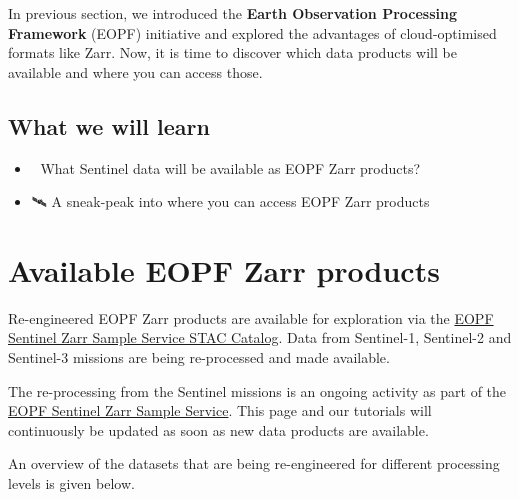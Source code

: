 \documentclass[
  letterpaper,
  DIV=11,
  numbers=noendperiod]{scrreprt}
\providecommand{\tightlist}{%
  \setlength{\itemsep}{0pt}\setlength{\parskip}{0pt}}
\begin{document}
In previous section, we introduced the \textbf{Earth Observation
Processing Framework} (EOPF) initiative and explored the advantages of
cloud-optimised formats like Zarr. Now, it is time to discover which
data products will be available and where you can access those.

\subsection{What we will learn}\label{what-we-will-learn-1}

\begin{itemize}
\tightlist
\item
  💾 What Sentinel data will be available as EOPF Zarr products?
\item
  🛰️ A sneak-peak into where you can access EOPF Zarr products
\end{itemize}

\section{Available EOPF Zarr
products}\label{available-eopf-zarr-products}

Re-engineered EOPF Zarr products are available for exploration via the
\href{https://stac.browser.user.eopf.eodc.eu/?.language=en}{EOPF
Sentinel Zarr Sample Service STAC Catalog}. Data from Sentinel-1,
Sentinel-2 and Sentinel-3 missions are being re-processed and made
available.

\begin{tcolorbox}[enhanced jigsaw, coltitle=black, colback=white, leftrule=.75mm, colbacktitle=quarto-callout-important-color!10!white, titlerule=0mm, title=\textcolor{quarto-callout-important-color}{\faExclamation}\hspace{0.5em}{Important}, rightrule=.15mm, bottomrule=.15mm, bottomtitle=1mm, toptitle=1mm, arc=.35mm, toprule=.15mm, left=2mm, opacityback=0, colframe=quarto-callout-important-color-frame, opacitybacktitle=0.6, breakable]

The re-processing from the Sentinel missions is an ongoing activity as
part of the \href{https://zarr.eopf.copernicus.eu/}{EOPF Sentinel Zarr
Sample Service}. This page and our tutorials will continuously be
updated as soon as new data products are available.

\end{tcolorbox}

An overview of the datasets that are being re-engineered for different
processing levels is given below.
\end{document}
